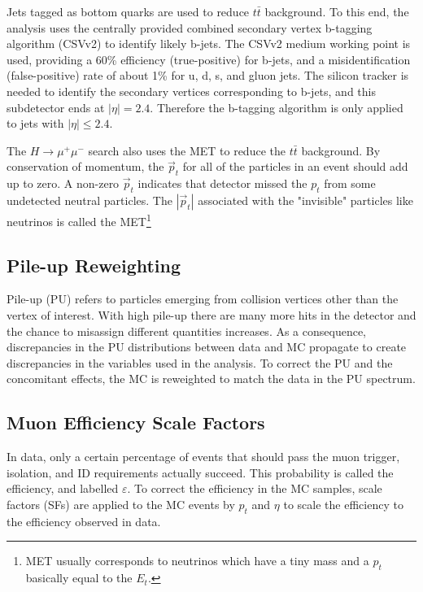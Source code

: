 Jets tagged as bottom quarks are used to reduce $t\bar{t}$ background. To this end, the analysis uses the centrally provided combined secondary vertex b-tagging algorithm (CSVv2) to identify likely b-jets. The CSVv2 medium working point is used, providing a 60\% efficiency (true-positive) for b-jets, and a misidentification (false-positive) rate of about 1\% for u, d, s, and gluon jets. The silicon tracker is needed to identify the secondary vertices corresponding to b-jets, and this subdetector ends at $|\eta|=2.4$. Therefore the b-tagging algorithm is only applied to jets with $|\eta| \leq 2.4$.

The $H\rightarrow\mu^+\mu^-$ search also uses the MET to reduce the $t\bar{t}$ background. By conservation of momentum, the $\vec{p}_t$ for all of the particles in an event should add up to zero. A non-zero $\vec{p}_t$ indicates that detector missed the $p_t$ from some undetected neutral particles. The $|\vec{p}_t|$ associated with the "invisible" particles like neutrinos is called the MET\footnote{MET usually corresponds to neutrinos which have a tiny mass and a $p_t$ basically equal to the $E_t$.}

\subsection{Pile-up Reweighting}
Pile-up (PU) refers to particles emerging from collision vertices other than the vertex of interest. With high pile-up there are many more hits in the detector and the chance to misassign different quantities increases. As a consequence, discrepancies in the PU distributions between data and MC propagate to create discrepancies in the variables used in the analysis. To correct the PU and the concomitant effects, the MC is reweighted to match the data in the PU spectrum. 
\subsection{Muon Efficiency Scale Factors}
In data, only a certain percentage of events that should pass the muon trigger, isolation, and ID requirements actually succeed. This probability is called the efficiency, and labelled $\varepsilon$. To correct the efficiency in the MC samples, scale factors (SFs) are applied to the MC events by $p_t$ and $\eta$ to scale the efficiency to the efficiency observed in data.  

